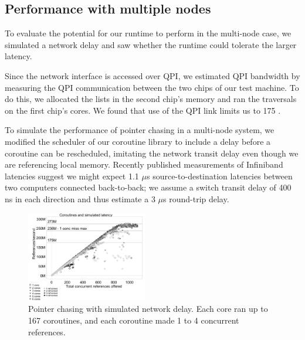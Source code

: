 \documentclass[10pt,nocopyrightspace,preprint]{sigplanconf}
\begin{document}
\subsection{Performance with multiple nodes}

To evaluate the potential for our runtime to perform in the multi-node case, we simulated a network delay and saw whether the runtime could tolerate the larger latency. 

Since the network interface is accessed over QPI, we estimated QPI bandwidth by measuring the QPI communication between the two chips of our test machine. To do this, we allocated the lists in the second chip's memory and ran the traversals on the first chip's cores. We found that use of the QPI link limits us to 175 \mrps.


To simulate the performance of pointer chasing in a
multi-node system, we modified the scheduler of our coroutine library
to include a delay before a coroutine can be rescheduled, imitating
the network transit delay even though we are referencing local
memory. Recently published measurements of Infiniband latencies
 suggest we might expect 1.1 $\mu$s source-to-destination
latencies between two computers connected back-to-back; we assume a
switch transit delay of 400 ns  in each direction and thus estimate a 3
$\mu$s round-trip delay.

\begin{figure}[h]
  \begin{center}
    \includegraphics[width=0.47\textwidth]{figures/multi-green-delay7800-edited.pdf}
  \end{center}
  \vspace{3pt}
  \caption{Pointer chasing with simulated network delay. Each core ran up to 167 coroutines, and each coroutine made 1 to 4 concurrent references.}
  \label{fig:network-delay}
\end{figure}
\end{document}
